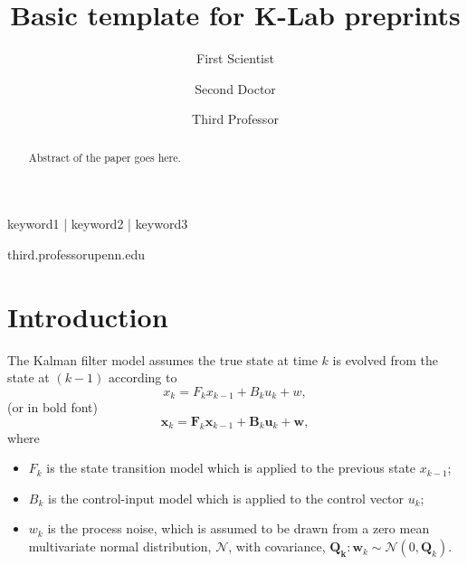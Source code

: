 
\title{Basic template for K-Lab preprints}

\author[1]{First Scientist }
\author[2]{Second Doctor }
\author[1,\Letter]{Third Professor }
\date{}

\maketitle

\begin{abstract}
Abstract of the paper goes here.
\lipsum[1]
\end{abstract}

\begin{keywords}
keyword1 | keyword2 | keyword3
\end{keywords}

\begin{corrauthor}
third.professor\at upenn.edu
\end{corrauthor}

\section*{Introduction}\label{s:introduction}

The Kalman filter model assumes the true state at time $k$ is evolved from the state at $(k - 1)$ according to
\begin{equation}
    x _{k}=F_{k} x _{k-1}+ B_{k} u _{k}+ w,
\end{equation}
(or in bold font)
\begin{equation}
    \mathbf{x}_{k}=\mathbf{F}_{k} \mathbf{x}_{k-1} + \mathbf{B}_{k} \mathbf{u}_{k}+ \mathbf{w},
\end{equation}
where

\begin{itemize}
    \item $F_k$ is the state transition model which is applied to the previous state $x_{k-1}$;
    \item $B_k$ is the control-input model which is applied to the control vector $u_k$;
    \item $w_k$ is the process noise, which is assumed to be drawn from a zero mean multivariate normal distribution, $\mathbf{\mathcal{N}}$, with covariance, $\mathbf{Q_k}: {\displaystyle \mathbf {w} _{k}\sim {\mathcal {N}}\left(0,\mathbf {Q} _{k}\right)}$.
\end{itemize}

